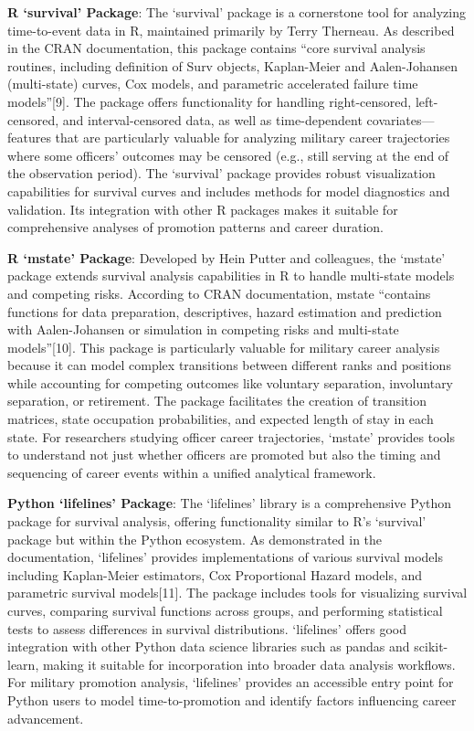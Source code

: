 \documentclass[
  letterpaper,
  DIV=11,
  numbers=noendperiod]{scrartcl}
\begin{document}
\textbf{R `survival' Package}: The `survival' package is a cornerstone
tool for analyzing time-to-event data in R, maintained primarily by
Terry Therneau. As described in the CRAN documentation, this package
contains ``core survival analysis routines, including definition of Surv
objects, Kaplan-Meier and Aalen-Johansen (multi-state) curves, Cox
models, and parametric accelerated failure time models''{[}9{]}. The
package offers functionality for handling right-censored, left-censored,
and interval-censored data, as well as time-dependent
covariates---features that are particularly valuable for analyzing
military career trajectories where some officers' outcomes may be
censored (e.g., still serving at the end of the observation period). The
`survival' package provides robust visualization capabilities for
survival curves and includes methods for model diagnostics and
validation. Its integration with other R packages makes it suitable for
comprehensive analyses of promotion patterns and career duration.

\textbf{R `mstate' Package}: Developed by Hein Putter and colleagues,
the `mstate' package extends survival analysis capabilities in R to
handle multi-state models and competing risks. According to CRAN
documentation, mstate ``contains functions for data preparation,
descriptives, hazard estimation and prediction with Aalen-Johansen or
simulation in competing risks and multi-state models''{[}10{]}. This
package is particularly valuable for military career analysis because it
can model complex transitions between different ranks and positions
while accounting for competing outcomes like voluntary separation,
involuntary separation, or retirement. The package facilitates the
creation of transition matrices, state occupation probabilities, and
expected length of stay in each state. For researchers studying officer
career trajectories, `mstate' provides tools to understand not just
whether officers are promoted but also the timing and sequencing of
career events within a unified analytical framework.

\textbf{Python `lifelines' Package}: The `lifelines' library is a
comprehensive Python package for survival analysis, offering
functionality similar to R's `survival' package but within the Python
ecosystem. As demonstrated in the documentation, `lifelines' provides
implementations of various survival models including Kaplan-Meier
estimators, Cox Proportional Hazard models, and parametric survival
models{[}11{]}. The package includes tools for visualizing survival
curves, comparing survival functions across groups, and performing
statistical tests to assess differences in survival distributions.
`lifelines' offers good integration with other Python data science
libraries such as pandas and scikit-learn, making it suitable for
incorporation into broader data analysis workflows. For military
promotion analysis, `lifelines' provides an accessible entry point for
Python users to model time-to-promotion and identify factors influencing
career advancement.
\end{document}
